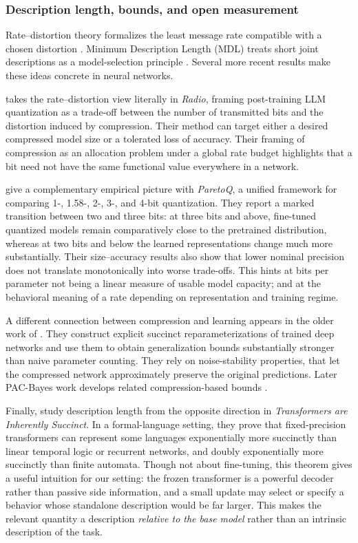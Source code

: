 \subsubsection{Description length, bounds, and open measurement}

Rate--distortion theory formalizes the least message rate compatible with a chosen distortion \parencite{berger1971rate,cover2006elements}. Minimum Description Length (MDL) treats short joint descriptions as a model-selection principle \parencite{grunwald2019mdl}. Several more recent results make these ideas concrete in neural networks.

\textcite{young2025radio} takes the rate--distortion view literally in \emph{Radio}, framing post-training LLM quantization as a trade-off between the number of transmitted bits and the distortion induced by compression. Their method can target either a desired compressed model size or a tolerated loss of accuracy. Their framing of compression as an allocation problem under a global rate budget highlights that a bit need not have the same functional value everywhere in a network.

\textcite{liu2025paretoq} give a complementary empirical picture with \emph{ParetoQ}, a unified framework for comparing 1-, 1.58-, 2-, 3-, and 4-bit quantization. They report a marked transition between two and three bits: at three bits and above, fine-tuned quantized models remain comparatively close to the pretrained distribution, whereas at two bits and below the learned representations change much more substantially. Their size--accuracy results also show that lower nominal precision does not translate monotonically into worse trade-offs. This hints at bits per parameter not being a linear measure of usable model capacity; and at the behavioral meaning of a rate depending on representation and training regime.

A different connection between compression and learning appears in the older work of \textcite{arora2018compression}. They construct explicit succinct reparameterizations of trained deep networks and use them to obtain generalization bounds substantially stronger than naive parameter counting. They rely on noise-stability properties, that let the compressed network approximately preserve the original predictions. Later PAC-Bayes work develops related compression-based bounds \parencite{zhou2019pacbayes,lotfi2022pacbayes}.

Finally, \textcite{bergstrasser2026succinct} study description length from the opposite direction in \emph{Transformers are Inherently Succinct}. In a formal-language setting, they prove that fixed-precision transformers can represent some languages exponentially more succinctly than linear temporal logic or recurrent networks, and doubly exponentially more succinctly than finite automata. Though not about fine-tuning, this theorem gives a useful intuition for our setting: the frozen transformer is a powerful decoder rather than passive side information, and a small update may select or specify a behavior whose standalone description would be far larger. This makes the relevant quantity a description \emph{relative to the base model} rather than an intrinsic description of the task.

